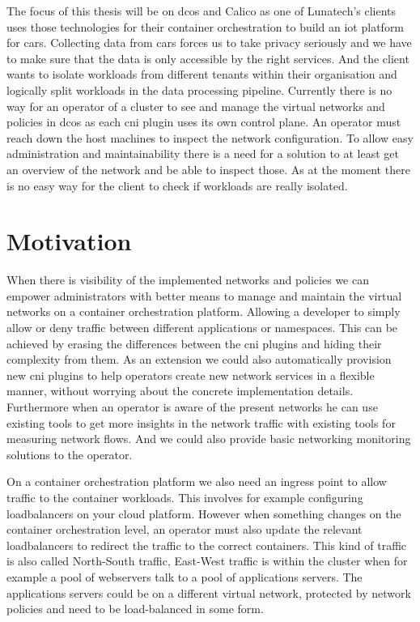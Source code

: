 The focus of this thesis will be on \gls{dcos} and Calico as one of Lunatech's clients uses those technologies for their container orchestration to build an \gls{iot} platform for cars. Collecting data from cars forces us to take privacy seriously and we have to make sure that the data is only accessible by the right services. And the client wants to isolate workloads from different tenants within their organisation and logically split workloads in the data processing pipeline. Currently there is no way for an operator of a cluster to see and manage the virtual networks and policies in \gls{dcos} as each \gls{cni} plugin uses its own control plane. An operator must reach down the host machines to inspect the network configuration. To allow easy administration and maintainability there is a need for a solution to at least get an overview of the network and be able to inspect those. As at the moment there is no easy way for the client to check if workloads are really isolated. 

\section{Motivation}
When there is visibility of the implemented networks and policies we can empower administrators with better means to manage and maintain the virtual networks on a container orchestration platform. Allowing a developer to simply allow or deny traffic between different applications or namespaces. This can be achieved by erasing the differences between the \gls{cni} plugins and hiding their complexity from them. As an extension we could also automatically provision new \gls{cni} plugins to help operators create new network services in a flexible manner, without worrying about the concrete implementation details. Furthermore when an operator is aware of the present networks he can use existing tools to get more insights in the network traffic with existing tools for measuring network flows. And we could also provide basic networking monitoring solutions to the operator.

On a container orchestration platform we also need an ingress point to allow traffic to the container workloads. This involves for example configuring loadbalancers on your cloud platform. However when something changes on the container orchestration level, an operator must also update the relevant loadbalancers to redirect the traffic to the correct containers. This kind of traffic is also called North-South traffic, East-West traffic is within the cluster when for example a pool of webservers talk to a pool of applications servers. The applications servers could be on a different virtual network, protected by network policies and need to be load-balanced in some form.

